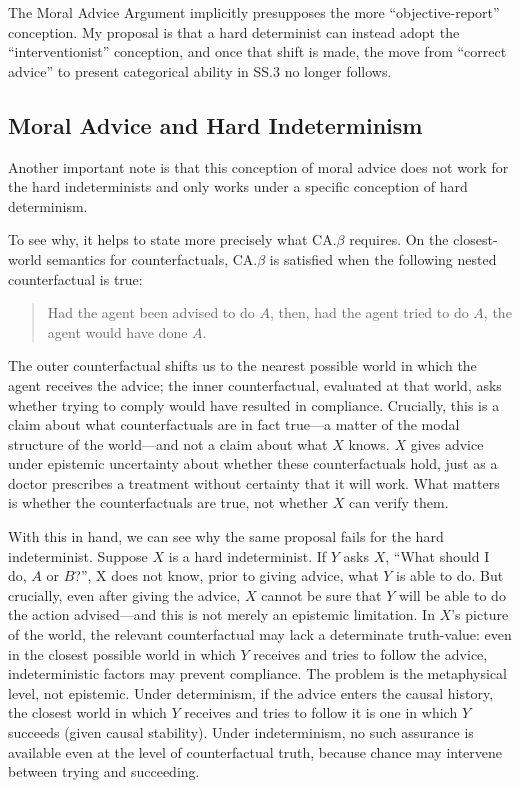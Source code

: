 The Moral Advice Argument implicitly presupposes the more
``objective-report'' conception. My proposal is that a hard determinist
can instead adopt the ``interventionist'' conception, and once that
shift is made, the move from ``correct advice'' to present categorical
ability in SS.3 no longer follows.

\subsection{Moral Advice and Hard Indeterminism}

Another important note is that this conception of moral advice does not
work for the hard indeterminists and only works under a specific
conception of hard determinism.

To see why, it helps to state more precisely what CA.$\beta$ requires. On the
closest-world semantics for counterfactuals, CA.$\beta$ is satisfied when the
following nested counterfactual is true:

\vspace{-1em}
\begin{quote}
Had the agent been advised to do $A$, then, had the agent tried to do $A$,
the agent would have done $A$.
\end{quote}

\noindent The outer counterfactual shifts us to the nearest possible world in
which the agent receives the advice; the inner counterfactual, evaluated
at that world, asks whether trying to comply would have resulted in
compliance. Crucially, this is a claim about what counterfactuals are in
fact true---a matter of the modal structure of the world---and not a
claim about what $X$ knows. $X$ gives advice under epistemic uncertainty
about whether these counterfactuals hold, just as a doctor prescribes a
treatment without certainty that it will work. What matters is whether
the counterfactuals are true, not whether $X$ can verify them.

With this in hand, we can see why the same proposal fails for the hard
indeterminist. Suppose $X$ is a hard indeterminist. If $Y$ asks $X$, ``What
should I do, $A$ or $B$?'', X does not know, prior to giving advice, what $Y$
is able to do. But crucially, even after giving the advice, $X$ cannot be
sure that $Y$ will be able to do the action advised---and this is not
merely an epistemic limitation. In $X$'s picture of the world, the
relevant counterfactual may lack a determinate truth-value: even in the
closest possible world in which $Y$ receives and tries to follow the
advice, indeterministic factors may prevent compliance. The problem is
the metaphysical level, not epistemic. Under determinism, if the advice
enters the causal history, the closest world in which $Y$ receives and
tries to follow it is one in which $Y$ succeeds (given causal stability).
Under indeterminism, no such assurance is available even at the level of
counterfactual truth, because chance may intervene between trying and
succeeding.


